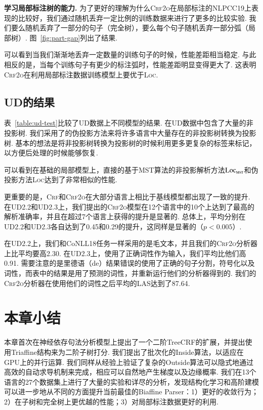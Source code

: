 \noindent\textbf{学习局部标注树的能力.}
为了更好的理解为什么\textsc{Crf2o}在局部标注的NLPCC19上表现的比较好，我们通过随机丢弃一定比例的训练数据来进行了更多的比较实验.
我们要么随机丢弃了一部分的句子（完全树），要么每个句子随机丢弃一部分弧（局部树）.
图~\ref{fig:part-gap}列出了结果.

可以看到当我们渐渐地丢弃一定数量的训练句子的时候，性能差距相当稳定.
与此相反的是，当每个训练句子有更少的标注弧时，性能差距明显变得更大了.
这表明\textsc{Crf2o}在利用局部标注数据训练模型上要优于\textsc{Loc}.



\subsection{UD的结果}

表~\ref{table:ud-test}比较了UD数据上不同模型的结果.
在UD数据中包含了大量的非投影树.
我们采用了\cite{nivre-nilsson-2005-pseudo}的伪投影方法来将许多语言中大量存在的非投影树转换为投影树.
基本的想法是将非投影树转换为投影树的时候利用更多更复杂的标签来标记，以方便后处理的时候能够恢复.

可以看到在基础的局部模型上，直接的基于MST算法的非投影解析方法$\textsc{Loc}_{\textsc{mst}}$和伪投影方法\textsc{Loc}达到了非常相似的性能.

更重要的是，\textsc{Crf}和\textsc{Crf2o}在大部分语言上相比于基线模型都出现了一致的提升.
在UD2.2和UD2.3上，我们提出的\textsc{Crf2o}模型在12个语言中的10个上达到了最高的解析准确率，并且在超过7个语言上获得的提升是显著的.
总体上，平均分别在UD2.2和UD2.3各自达到了0.45和0.29的提升，这同样是显著的（$p<0.005$）.

在UD2.2上，我们和CoNLL18任务一样采用的是毛文本，并且我们的\textsc{Crf2o}分析器上比\cite{ji-etal-2019-graph}平均要高2.30.
在UD2.3上，\cite{zhang-etal-2019-empirical}使用了正确词性作为输入，我们平均比他们高0.91.
需要注意的是\cite{ji-etal-2019-graph}里德语（de）结果错误的使用了正确的句子分割，符号化以及词性，而表中的结果是用了预测的词性，并重新运行他们的分析器得到的.
我们的\textsc{Crf2o}分析器在使用他们的词性之后平均的LAS达到了87.64.

\section{本章小结}
\label{sec:dep-conclusions}

本章首次在神经依存句法分析模型上提出了一个二阶TreeCRF的扩展，并提出使用Triaffine结构来为二阶子树打分.
我们提出了批次化的Inside算法，以适应在GPU上的并行运算.
我们同样从经验上验证了复杂的Outside算法可以隐式地通过高效的自动求导机制来完成，相应可以自然地产生梯度以及边缘概率.
我们在13个语言的27个数据集上进行了大量的实验和详尽的分析，发现结构化学习和高阶建模可以进一步地从不同的方面提升当前最佳的Biaffine Parser：1）更好的收敛行为；2）在子树和完全树上更优越的性能；3）对局部标注数据更好的利用.

